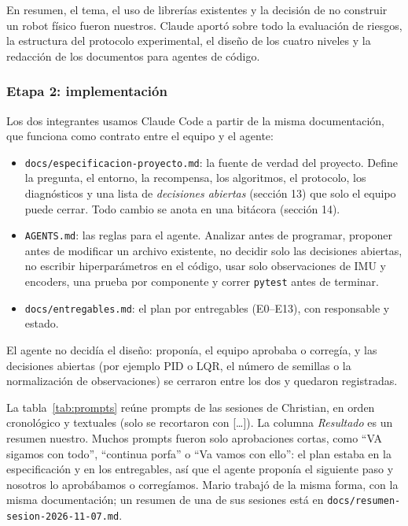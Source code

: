 \documentclass[11pt,a4paper]{article}
\newcommand{\code}[1]{\texttt{#1}}
\begin{document}
En resumen, el tema, el uso de librerías existentes y la decisión de no construir un robot físico fueron nuestros. Claude aportó sobre todo la evaluación de riesgos, la estructura del protocolo experimental, el diseño de los cuatro niveles y la redacción de los documentos para agentes de código.

\subsubsection{Etapa 2: implementación}

Los dos integrantes usamos Claude Code a partir de la misma documentación, que funciona como contrato entre el equipo y el agente:
\begin{itemize}
  \item \code{docs/especificacion-proyecto.md}: la fuente de verdad del proyecto. Define la pregunta, el entorno, la recompensa, los algoritmos, el protocolo, los diagnósticos y una lista de \emph{decisiones abiertas} (sección 13) que solo el equipo puede cerrar. Todo cambio se anota en una bitácora (sección 14).
  \item \code{AGENTS.md}: las reglas para el agente. Analizar antes de programar, proponer antes de modificar un archivo existente, no decidir solo las decisiones abiertas, no escribir hiperparámetros en el código, usar solo observaciones de IMU y encoders, una prueba por componente y correr \code{pytest} antes de terminar.
  \item \code{docs/entregables.md}: el plan por entregables (E0--E13), con responsable y estado.
\end{itemize}
El agente no decidía el diseño: proponía, el equipo aprobaba o corregía, y las decisiones abiertas (por ejemplo PID o LQR, el número de semillas o la normalización de observaciones) se cerraron entre los dos y quedaron registradas.

La tabla~\ref{tab:prompts} reúne prompts de las sesiones de Christian, en orden cronológico y textuales (solo se recortaron con [\ldots]). La columna \emph{Resultado} es un resumen nuestro. Muchos prompts fueron solo aprobaciones cortas, como ``VA sigamos con todo'', ``continua porfa'' o ``Va vamos con ello'': el plan estaba en la especificación y en los entregables, así que el agente proponía el siguiente paso y nosotros lo aprobábamos o corregíamos. Mario trabajó de la misma forma, con la misma documentación; un resumen de una de sus sesiones está en \code{docs/resumen-sesion-2026-11-07.md}.
\end{document}
